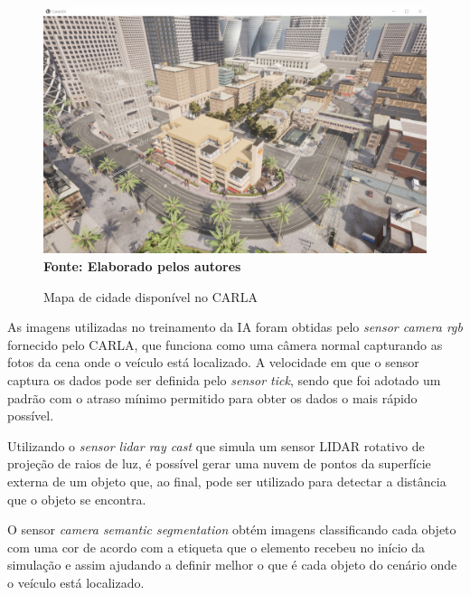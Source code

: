 \documentclass[a4paper,12pt,Times]{article}
\begin{document}
\begin{figure}[!htb]

  \centering
    \caption{Mapa de cidade disponível no CARLA}
    \includegraphics[scale=0.25]{figuras/mapa1-carla.jpeg}
    \captionsetup{justification=centering}
  \vspace{-0.2cm}
     \\\textbf{\footnotesize Fonte: Elaborado pelos autores}
    \label{fig:cidade_carla_simulator_primeira_pessoa}

\end{figure}


As imagens utilizadas no treinamento da IA foram obtidas pelo \textit{sensor camera rgb} fornecido pelo CARLA, que funciona como uma câmera normal capturando as fotos da cena onde o veículo está localizado. A velocidade em que o sensor captura os dados pode ser definida pelo \textit{sensor tick}, sendo que foi adotado um padrão com o atraso mínimo permitido para obter os dados o mais rápido possível.

Utilizando o \textit{sensor lidar ray cast} que simula um sensor LIDAR rotativo de projeção de raios de luz, é possível gerar uma nuvem de pontos da superfície externa de um objeto que, ao final, pode ser utilizado para detectar a distância que o objeto se encontra.

O sensor \textit{camera semantic segmentation} obtém imagens classificando cada objeto com uma cor de acordo com a etiqueta que o elemento recebeu no início da simulação e assim ajudando a definir melhor o que é cada objeto do cenário onde o veículo está localizado.

\end{document}
